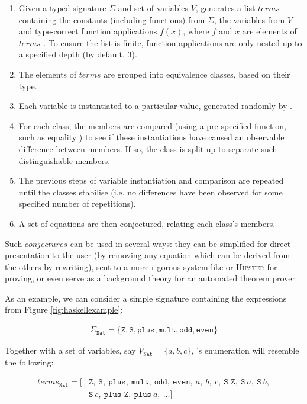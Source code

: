 \begin{enumerate}
  \item Given a typed signature $\Sigma$ and set of variables $V$, \qspec{} generates a list $terms$ containing the constants (including functions) from $\Sigma$, the variables from $V$ and type-correct function applications $f(x)$, where $f$ and $x$ are elements of $terms$ \iffalse TODO: A little awkward; maybe use the above notation? \fi. To ensure the list is finite, function applications are only nested up to a specified depth (by default, 3).
  \item The elements of $terms$ are grouped into equivalence classes, based on their type.
  \item Each variable is instantiated to a particular value, generated randomly by \qcheck{}.
  \item For each class, the members are compared (using a pre-specified function, such as equality \hs{==}) to see if these instantiations have caused an observable difference between members. If so, the class is split up to separate such distinguishable members.
  \item The previous steps of variable instantiation and comparison are repeated until the classes stabilise (i.e. no differences have been observed for some specified number of repetitions).
  \item A set of equations are then conjectured, relating each class's members.
\end{enumerate}

Such $conjectures$ can be used in several ways: they can be simplified for direct presentation to the user (by removing any equation which can be derived from the others by rewriting), sent to a more rigorous system like \hspec{} or \textsc{Hipster} for proving, or even serve as a background theory for an automated theorem prover \citep{claessen2013automating}.

As an example, we can consider a simple signature containing the expressions from Figure \ref{fig:haskellexample}:

\begin{align*}
  \Sigma_{\texttt{Nat}} = \{\texttt{Z}, \texttt{S}, \texttt{plus}, \texttt{mult}, \texttt{odd}, \texttt{even}\}
\end{align*}

Together with a set of variables, say $V_{\texttt{Nat}} = \{a, b, c\}$, \qspec{}'s enumeration will resemble the following:

\begin{align*}
  terms_{\texttt{Nat}} = [& \texttt{Z},\ \texttt{S},\ \texttt{plus},\ \texttt{mult},\ \texttt{odd},\ \texttt{even},\ a,\ b,\ c,\ \texttt{S Z},\ \texttt{S}\ a,\ \texttt{S}\ b, \\
                     & \texttt{S}\ c,\ \texttt{plus Z},\ \texttt{plus}\ a,\ \dots ]
\end{align*}

